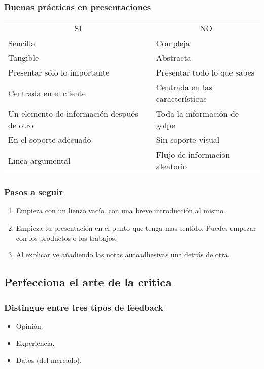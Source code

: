 \documentclass[11pt]{book}
\begin{document}
\subsubsection{Buenas prácticas en presentaciones}
\begin{table}[htbp]
  \centering
  
    \begin{tabular}{ll}
    \multicolumn{1}{c}{SI} & \multicolumn{1}{c}{NO} \\
    Sencilla & Compleja  \\
    Tangible & Abstracta \\
    Presentar sólo lo importante & Presentar todo lo que sabes \\
    Centrada en el cliente & Centrada en las características \\
    Un elemento de información después de otro & Toda la información de golpe \\
    En el soporte adecuado & Sin soporte visual \\
    Línea argumental & Flujo de información aleatorio \\
    \end{tabular}%
  \label{tab:addlabel}%
\end{table}%

\subsubsection{Pasos a seguir}
\begin{enumerate}
\item Empieza con un lienzo vacío. con una breve introducción al mismo.
\item Empieza tu presentación en el punto que tenga mas sentido. Puedes empezar con los productos o los trabajos.
\item Al explicar ve añadiendo las notas autoadhesivas una detrás de otra.
\end{enumerate}
\subsection{Perfecciona el arte de la critica}
\subsubsection{Distingue entre tres tipos de feedback}
\begin{itemize}
\item Opinión.
\item Experiencia.
\item Datos (del mercado).

\end{itemize}
\end{document}
